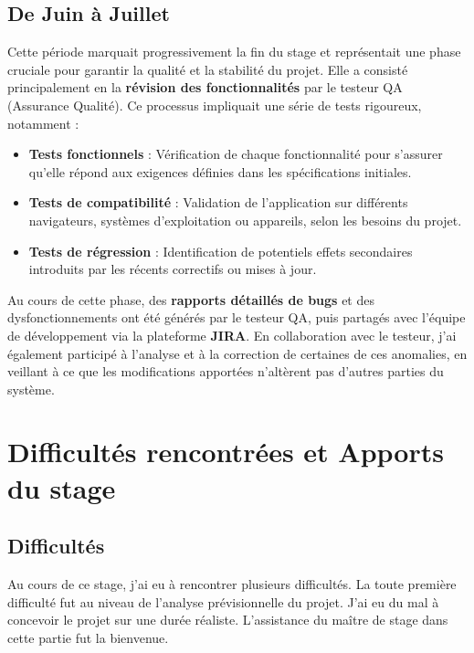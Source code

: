 {\subsection*{De Juin à Juillet}

Cette période marquait progressivement la fin du stage et représentait une phase cruciale pour garantir la qualité et la stabilité du projet. Elle a consisté principalement en la \textbf{révision des fonctionnalités} par le testeur QA (Assurance Qualité). Ce processus impliquait une série de tests rigoureux, notamment :  

\begin{itemize}
    \item \textbf{Tests fonctionnels} : Vérification de chaque fonctionnalité pour s'assurer qu'elle répond aux exigences définies dans les spécifications initiales.
    \item \textbf{Tests de compatibilité} : Validation de l'application sur différents navigateurs, systèmes d'exploitation ou appareils, selon les besoins du projet.  
    \item \textbf{Tests de régression} : Identification de potentiels effets secondaires introduits par les récents correctifs ou mises à jour.  
\end{itemize}

Au cours de cette phase, des \textbf{rapports détaillés de bugs} et des dysfonctionnements ont été générés par le testeur QA, puis partagés avec l'équipe de développement via la plateforme \textbf{JIRA}. En collaboration avec le testeur, j’ai également participé à l’analyse et à la correction de certaines de ces anomalies, en veillant à ce que les modifications apportées n’altèrent pas d’autres parties du système.

\section{Difficultés rencontrées et Apports du stage}

\subsection*{Difficultés}

Au cours de ce stage, j’ai eu à rencontrer plusieurs difficultés. La toute première difficulté fut au niveau de l'analyse prévisionnelle du projet. J'ai eu du mal à concevoir le projet sur une durée réaliste. L'assistance du maître de stage dans cette partie fut la bienvenue. \\

}
